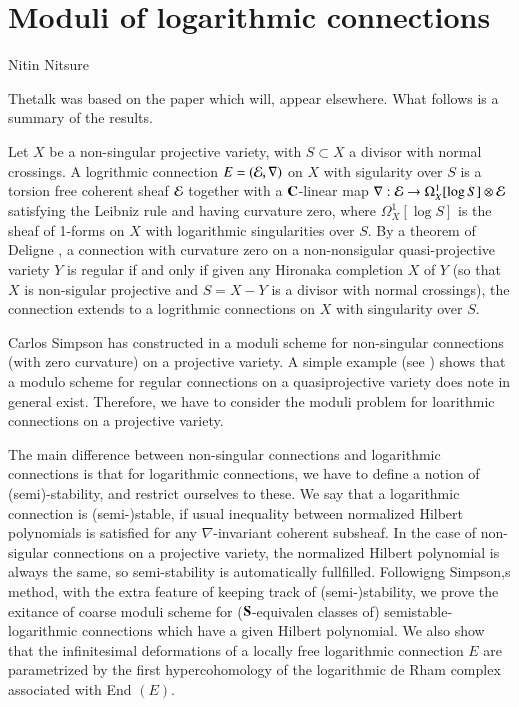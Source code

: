 \chapter{Moduli of logarithmic connections}\label{chap14}


\begin{center}
Nitin Nitsure
\end{center}

\setcounter{pageoriginal}{272}
The\pageoriginale talk was based on the paper \cite{chap14-keyN} which will, appear elsewhere. What follows is a summary of the results.

Let $X$ be a non-singular projective variety, with $S\subset X$ a divisor with normal crossings. A logrithmic connection $E=(\mathcal{E}, \nabla)$ on $X$ with sigularity over $S$ is a torsion free coherent sheaf  $\mathcal{E}$ together with a $\mathbf{C}$-linear map $\nabla : \mathcal{E} \rightarrow \Omega_{X}^{1}[\log S] \otimes \mathcal{E}$ satisfying the Leibniz rule and having curvature zero, where $\Omega_{X}^{1}[\log S]$ is the sheaf of 1-forms on $X$ with logarithmic singularities over $S$. By a theorem of Deligne \cite{chap14-keyD}, a connection with curvature zero on a non-nonsigular quasi-projective variety $Y$ is regular if and only if given any Hironaka completion $X$ of $Y$ (so that $X$ is non-sigular projective and $S=X-Y$ is a divisor with normal crossings), the connection extends to a logrithmic connections on $X$ with singularity over $S$.

Carlos Simpson has constructed in \cite{chap14-keyS} a moduli scheme for non-singular connections (with zero curvature) on a projective variety. A simple example (see \cite{chap14-keyN}) shows that a modulo scheme for regular connections on a quasiprojective variety does note in general exist. Therefore, we have to consider the moduli problem for loarithmic connections on a projective variety.

The main difference between non-singular connections and logarithmic  connections is that for logarithmic connections,  we have to define a notion of (semi)-stability, and restrict ourselves to these. We say that  a logarithmic connection is (semi-)stable, if usual inequality between normalized Hilbert polynomials is satisfied for any $\nabla$-invariant coherent subsheaf. In the case of non-sigular connections on a projective variety, the normalized Hilbert polynomial is always the same, so semi-stability is automatically fullfilled. Followigng Simpson,s method, with the extra feature of keeping track of (semi-)stability, we prove the exitance of coarse moduli scheme for ($\mathbf{S}$-equivalen classes of) semistable-logarithmic connections which have a given Hilbert polynomial. We also show that the infinitesimal deformations of a locally free logarithmic connection $E$ are parametrized by the first hypercohomology of the logarithmic de Rham complex associated with End $(E)$.

